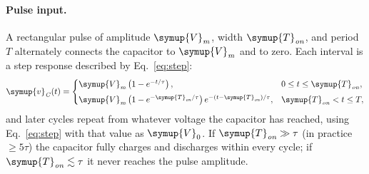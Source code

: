 \documentclass[12pt,a4paper]{article}
\begin{document}
	\paragraph{Pulse input.}
	A rectangular pulse of amplitude $\symup{V}_{\mathit{m}}$, width $\symup{T}_{\mathit{on}}$, and period $T$
	alternately connects the capacitor to $\symup{V}_{\mathit{m}}$ and to zero.  Each
	interval is a step response described by Eq.~\eqref{eq:step}:
	\begin{equation}
		\symup{v}_{\mathit{C}}(t) =
		\begin{cases}
			\symup{V}_{\mathit{m}}\left(1 - e^{-t/\tau}\right), & 0 \le t \le \symup{T}_{\mathit{on}}, \\[4pt]
			\symup{V}_{\mathit{m}}\left(1 - e^{-\symup{T}_{\mathit{on}}/\tau}\right) e^{-(t - \symup{T}_{\mathit{on}})/\tau},
			& \symup{T}_{\mathit{on}} < t \le T,
		\end{cases}
		\label{eq:pulse}
	\end{equation}
	and later cycles repeat from whatever voltage the capacitor has
	reached, using Eq.~\eqref{eq:step} with that value as $\symup{V}_{0}$.  If
	$\symup{T}_{\mathit{on}} \gg \tau$ (in practice $\ge 5\tau$) the capacitor fully
	charges and discharges within every cycle; if $\symup{T}_{\mathit{on}} \lesssim \tau$
	it never reaches the pulse amplitude.
	
\end{document}

